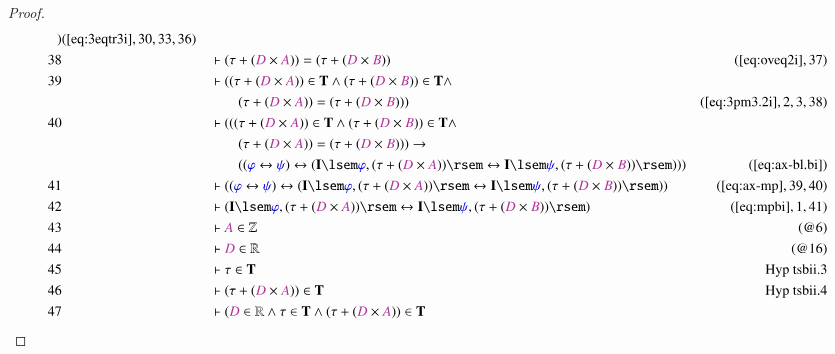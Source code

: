 \begin{proof}
\begin{align}
      )&(\mbox{\ref{eq:3eqtr3i}},30,33,36)\notag
  \\ 38 &&  & \vdash ( \tau + ( \mc{D} \times \mc{A} ) ) = ( \tau + ( \mc{D}
      \times \mc{B} ) )&(\mbox{\ref{eq:oveq2i}},37)\notag
  \\ 39 &&  & \vdash ( ( \tau + ( \mc{D} \times \mc{A} ) ) \in \mathbf{T} \wedge
      ( \tau + ( \mc{D} \times \mc{B} ) ) \in \mathbf{T}
      \wedge \notag \\ & & & \qquad
      ( \tau + ( \mc{D} \times \mc{A} ) ) = ( \tau +
      ( \mc{D} \times \mc{B} ) )
      )&(\mbox{\ref{eq:3pm3.2i}},2,3,38)\notag
  \\ 40 &&  & \vdash ( ( ( \tau + ( \mc{D} \times \mc{A} ) ) \in \mathbf{T}
      \wedge ( \tau + ( \mc{D} \times \mc{B} ) ) \in
      \mathbf{T} \wedge  \notag \\ & & & \qquad
     ( \tau + ( \mc{D} \times \mc{A} ) )
      = ( \tau + ( \mc{D} \times \mc{B} ) ) ) \rightarrow  \notag \\ & & & \qquad
     (
      ( \mw{\varphi} \leftrightarrow \mw{\psi} )
      \leftrightarrow ( \mathbf{I} \lsem \mw{\varphi} , (
      \tau + ( \mc{D} \times \mc{A} ) ) \rsem
      \leftrightarrow \mathbf{I} \lsem \mw{\psi} , ( \tau +
      ( \mc{D} \times \mc{B} ) ) \rsem ) )
      )&(\mbox{\ref{eq:ax-bl.bi}})\notag
  \\ 41 &&  & \vdash ( ( \mw{\varphi} \leftrightarrow \mw{\psi} )
      \leftrightarrow ( \mathbf{I} \lsem \mw{\varphi} , (
      \tau + ( \mc{D} \times \mc{A} ) ) \rsem
      \leftrightarrow \mathbf{I} \lsem \mw{\psi} , ( \tau +
      ( \mc{D} \times \mc{B} ) ) \rsem )
      )&(\mbox{\ref{eq:ax-mp}},39,40)\notag
  \\ 42 &&  & \vdash ( \mathbf{I} \lsem \mw{\varphi} , ( \tau + ( \mc{D} \times
      \mc{A} ) ) \rsem \leftrightarrow \mathbf{I} \lsem
      \mw{\psi} , ( \tau + ( \mc{D} \times \mc{B} ) ) \rsem
      )&(\mbox{\ref{eq:mpbi}},1,41)\notag
  \\ 43 &&  & \vdash \mc{A} \in \mathbb{Z}&(@6)\notag
  \\ 44 &&  & \vdash \mc{D} \in \mathbb{R}&(@16)\notag
  \\ 45 &&  & \vdash \tau \in \mathbf{T}&\text{Hyp~tsbii.3}\notag%
  \\ 46 &&  & \vdash ( \tau + ( \mc{D} \times \mc{A} ) ) \in
      \mathbf{T}&\text{Hyp~tsbii.4}\notag%
  \\ 47 &&  & \vdash ( \mc{D} \in \mathbb{R} \wedge \tau \in \mathbf{T} \wedge
      ( \tau + ( \mc{D} \times \mc{A} ) ) \in \mathbf{T}

\end{align}
\end{proof}
